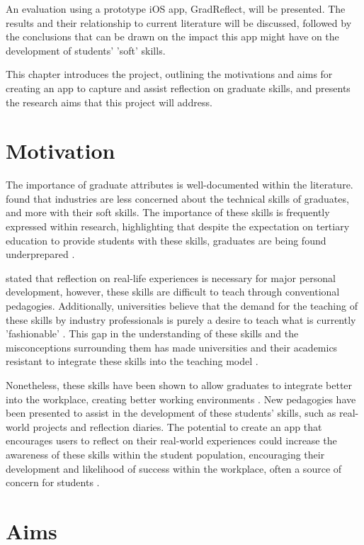 \documentclass{l4proj}
\begin{document}
An evaluation using a prototype iOS app, GradReflect, will be presented. The results and their relationship to current literature will be discussed, followed by the conclusions that can be drawn on the impact this app might have on the development of students' 'soft' skills.

This chapter introduces the project, outlining the motivations and aims for creating an app to capture and assist reflection on graduate skills, and presents the research aims that this project will address.


\section{Motivation}
The importance of graduate attributes is well-documented within the literature. \citet{litchfield_contextualising_2010} found that industries are less concerned about the technical skills of graduates, and more with their soft skills. The importance of these skills is frequently expressed within research, highlighting that despite the expectation on tertiary education to provide students with these skills, graduates are being found underprepared \citep{stevens_industry_2016}. 

\citet{abernethy_teaching_2009} stated that reflection on real-life experiences is necessary for major personal development, however, these skills are difficult to teach through conventional pedagogies. Additionally, universities believe that the demand for the teaching of these skills by industry professionals is purely a desire to teach what is currently 'fashionable' \citep{stevens_industry_2016}. This gap in the understanding of these skills and the misconceptions surrounding them has made universities and their academics resistant to integrate these skills into the teaching model \citep{barr_2019}. 

Nonetheless, these skills have been shown to allow graduates to integrate better into the workplace, creating better working environments \citep{stevens_industry_2016}. New pedagogies have been presented to assist in the development of these students' skills, such as real-world projects and reflection diaries. The potential to create an app that encourages users to reflect on their real-world experiences could increase the awareness of these skills within the student population, encouraging their development and likelihood of success within the workplace, often a source of concern for students \citep{stevens_industry_2016}.


\section{Aims} \label{IntroAims}
\end{document}

